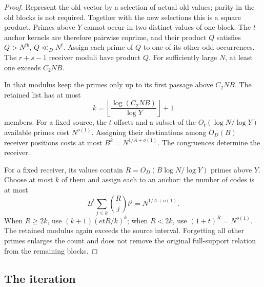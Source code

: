 \begin{proof}
Represent the old vector by a selection of actual old values;
parity in the old blocks is not required. Together with the
new selections this is a square product.
Primes above \(Y\) cannot occur in two distinct values
of one block. The \(t\) anchor kernels are therefore
pairwise coprime, and their product \(Q\) satisfies
\(Q>N^{tb}\), \(Q\ll_D N^t\).
Assign each prime of \(Q\) to one of its other odd occurrences.
The \(r+s-1\) receiver moduli have product \(Q\).
For sufficiently large \(N\), at least one exceeds \(C_2NB\).

In that modulus keep the primes only up to its first passage
above \(C_2NB\). The retained list has at most
\[
 k=\left\lfloor\frac{\log(C_2NB)}{\log Y}\right\rfloor+1
\]
members. For a fixed source, the \(t\) offsets and a subset
of the \(O_t(\log N/\log Y)\) available primes cost
\(N^{o(1)}\). Assigning their destinations among \(O_D(B)\)
receiver positions costs at most
\(B^k=N^{1/A+o(1)}\). The congruences determine the receiver.

For a fixed receiver, its values contain
\(R=O_D(B\log N/\log Y)\) primes above \(Y\).
Choose at most \(k\) of them and assign each to an anchor:
the number of codes is at most
\[
 B^t\sum_{j\le k}\binom Rj t^j=N^{1/A+o(1)}.
\]
When \(R\ge2k\), use \((k+1)(etR/k)^k\);
when \(R<2k\), use \((1+t)^R=N^{o(1)}\).
The retained modulus again exceeds the source interval.
Forgetting all other primes enlarges the count and does not
remove the original full-support relation from the remaining
blocks.
\end{proof}

\subsection{The iteration}
\label{p14:comp:half:iteration}

